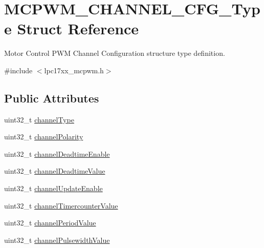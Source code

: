 \hypertarget{struct_m_c_p_w_m___c_h_a_n_n_e_l___c_f_g___type}{\section{\-M\-C\-P\-W\-M\-\_\-\-C\-H\-A\-N\-N\-E\-L\-\_\-\-C\-F\-G\-\_\-\-Type \-Struct \-Reference}
\label{struct_m_c_p_w_m___c_h_a_n_n_e_l___c_f_g___type}
}


\-Motor \-Control \-P\-W\-M \-Channel \-Configuration structure type definition.  




{\ttfamily \#include $<$lpc17xx\-\_\-mcpwm.\-h$>$}

\subsection*{\-Public \-Attributes}
\begin{DoxyCompactItemize}
\item 
uint32\-\_\-t \hyperlink{struct_m_c_p_w_m___c_h_a_n_n_e_l___c_f_g___type_a2788f235abbe80c743832d577c90b9d9}{channel\-Type}
\item 
uint32\-\_\-t \hyperlink{struct_m_c_p_w_m___c_h_a_n_n_e_l___c_f_g___type_a16b872e93890ee57eb783008b406649e}{channel\-Polarity}
\item 
uint32\-\_\-t \hyperlink{struct_m_c_p_w_m___c_h_a_n_n_e_l___c_f_g___type_a7f01b82a2dbff96760884fa0fd4a8f7d}{channel\-Deadtime\-Enable}
\item 
uint32\-\_\-t \hyperlink{struct_m_c_p_w_m___c_h_a_n_n_e_l___c_f_g___type_a29dea1ec970a5aaaf7d45c67d67960ad}{channel\-Deadtime\-Value}
\item 
uint32\-\_\-t \hyperlink{struct_m_c_p_w_m___c_h_a_n_n_e_l___c_f_g___type_a0fedf51bcb62b0dfac725871afd60809}{channel\-Update\-Enable}
\item 
uint32\-\_\-t \hyperlink{struct_m_c_p_w_m___c_h_a_n_n_e_l___c_f_g___type_a5d80bcea2409f5411a9455507f3c89d4}{channel\-Timercounter\-Value}
\item 
uint32\-\_\-t \hyperlink{struct_m_c_p_w_m___c_h_a_n_n_e_l___c_f_g___type_a84254da5df37e034680c7ac5f372e789}{channel\-Period\-Value}
\item 
uint32\-\_\-t \hyperlink{struct_m_c_p_w_m___c_h_a_n_n_e_l___c_f_g___type_a4b3d7a0f4ab0443503af9ff94b0010f1}{channel\-Pulsewidth\-Value}
\end{DoxyCompactItemize}


